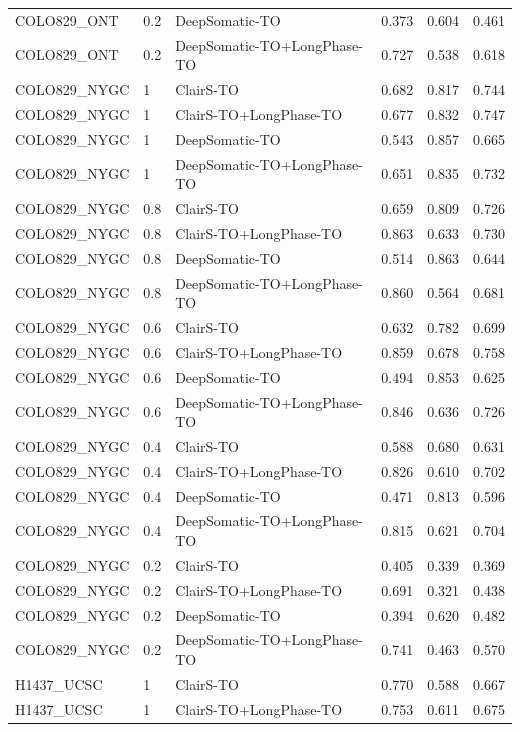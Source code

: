 \documentclass[pdflatex,sn-nature]{sn-jnl}
\begin{document}
{\begin{longtable}{@{}lllccc@{}}
  COLO829\_ONT & 0.2 & DeepSomatic-TO & 0.373 & 0.604 & 0.461 \\
  COLO829\_ONT & 0.2 & DeepSomatic-TO+LongPhase-TO & 0.727 & 0.538 & 0.618 \\
  COLO829\_NYGC & 1 & ClairS-TO & 0.682 & 0.817 & 0.744 \\
  COLO829\_NYGC & 1 & ClairS-TO+LongPhase-TO & 0.677 & 0.832 & 0.747 \\
  COLO829\_NYGC & 1 & DeepSomatic-TO & 0.543 & 0.857 & 0.665 \\
  COLO829\_NYGC & 1 & DeepSomatic-TO+LongPhase-TO & 0.651 & 0.835 & 0.732 \\
  COLO829\_NYGC & 0.8 & ClairS-TO & 0.659 & 0.809 & 0.726 \\
  COLO829\_NYGC & 0.8 & ClairS-TO+LongPhase-TO & 0.863 & 0.633 & 0.730 \\
  COLO829\_NYGC & 0.8 & DeepSomatic-TO & 0.514 & 0.863 & 0.644 \\
  COLO829\_NYGC & 0.8 & DeepSomatic-TO+LongPhase-TO & 0.860 & 0.564 & 0.681 \\
  COLO829\_NYGC & 0.6 & ClairS-TO & 0.632 & 0.782 & 0.699 \\
  COLO829\_NYGC & 0.6 & ClairS-TO+LongPhase-TO & 0.859 & 0.678 & 0.758 \\
  COLO829\_NYGC & 0.6 & DeepSomatic-TO & 0.494 & 0.853 & 0.625 \\
  COLO829\_NYGC & 0.6 & DeepSomatic-TO+LongPhase-TO & 0.846 & 0.636 & 0.726 \\
  COLO829\_NYGC & 0.4 & ClairS-TO & 0.588 & 0.680 & 0.631 \\
  COLO829\_NYGC & 0.4 & ClairS-TO+LongPhase-TO & 0.826 & 0.610 & 0.702 \\
  COLO829\_NYGC & 0.4 & DeepSomatic-TO & 0.471 & 0.813 & 0.596 \\
  COLO829\_NYGC & 0.4 & DeepSomatic-TO+LongPhase-TO & 0.815 & 0.621 & 0.704 \\
  COLO829\_NYGC & 0.2 & ClairS-TO & 0.405 & 0.339 & 0.369 \\
  COLO829\_NYGC & 0.2 & ClairS-TO+LongPhase-TO & 0.691 & 0.321 & 0.438 \\
  COLO829\_NYGC & 0.2 & DeepSomatic-TO & 0.394 & 0.620 & 0.482 \\
  COLO829\_NYGC & 0.2 & DeepSomatic-TO+LongPhase-TO & 0.741 & 0.463 & 0.570 \\
  H1437\_UCSC & 1 & ClairS-TO & 0.770 & 0.588 & 0.667 \\
  H1437\_UCSC & 1 & ClairS-TO+LongPhase-TO & 0.753 & 0.611 & 0.675 \\

\end{longtable}}
\end{document}
